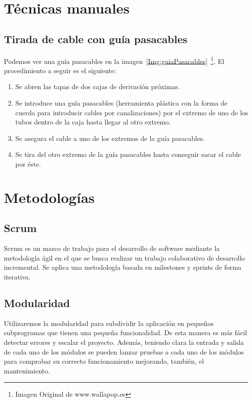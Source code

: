 \section{Técnicas manuales}

\subsection{Tirada de cable con guía pasacables}\label{4:guiaPasacables}
Podemos ver una guía pasacables en la imagen~\ref{Img:guiaPasacables}~\footnote{Imagen Original de www.wallapop.es}.
El procedimiento a seguir es el siguiente:
\begin{enumerate}
        \item Se abren las tapas de dos cajas de derivación próximas.
        \item Se introduce una guía pasacables (herramienta plástica con la forma de cuerda para introducir cables por canalizaciones) por el extremo de uno de los tubos dentro de la caja hasta llegar al otro extremo.
        \item Se asegura el cable a uno de los extremos de la guía pasacables.
        \item Se tira del otro extremo de la guía pasacables hasta conseguir sacar el cable por éste.
\end{enumerate}





\section{Metodologías}
\subsection{Scrum}\label{4:SCRUM}
Scrum\cite{manual:Scrum} es un marco de trabajo para el desarrollo de software mediante la metodología ágil en el que se busca realizar un trabajo colaborativo de desarrollo incremental. Se aplica una metodología basada en milestones y sprints de forma iterativa.

\subsection{Modularidad}\label{4:Modularidad}
Utilizaremos la modularidad para subdividir la aplicación en pequeños subprogramas que tienen una pequeña funcionalidad. De esta manera es más fácil detectar errores y escalar el proyecto. Además, teniendo clara la entrada y salida de cada uno de los módulos se pueden lanzar pruebas a cada uno de los módulos para comprobar su correcto funcionamiento mejorando, también, el mantenimiento.

